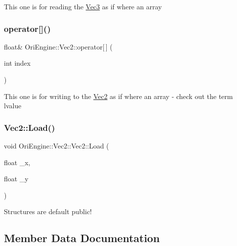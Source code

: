 This one is for reading the \hyperlink{struct_ori_engine_1_1_vec3}{Vec3} as if where an array \hypertarget{struct_ori_engine_1_1_vec2_a80dd5e430ccf80c1e7cac25da0262a8d}{}\label{struct_ori_engine_1_1_vec2_a80dd5e430ccf80c1e7cac25da0262a8d} 
\subsubsection{\texorpdfstring{operator[]()}{operator[]()}\hspace{0.1cm}{\footnotesize\ttfamily [2/2]}}
{\footnotesize\ttfamily float\& Ori\+Engine\+::\+Vec2\+::operator\mbox{[}$\,$\mbox{]} (\begin{DoxyParamCaption}\item[{int}]{index }\end{DoxyParamCaption})\hspace{0.3cm}{\ttfamily [inline]}}

This one is for writing to the \hyperlink{struct_ori_engine_1_1_vec2}{Vec2} as if where an array -\/ check out the term lvalue \hypertarget{struct_ori_engine_1_1_vec2_af08ea6c4eedd4b37fe25815f3555015e}{}\label{struct_ori_engine_1_1_vec2_af08ea6c4eedd4b37fe25815f3555015e} 
\subsubsection{\texorpdfstring{Vec2\+::\+Load()}{Vec2::Load()}}
{\footnotesize\ttfamily void Ori\+Engine\+::\+Vec2\+::\+Vec2\+::\+Load (\begin{DoxyParamCaption}\item[{float}]{\+\_\+x,  }\item[{float}]{\+\_\+y }\end{DoxyParamCaption})\hspace{0.3cm}{\ttfamily [inline]}}



Structures are default public! 



\subsection{Member Data Documentation}
\hypertarget{struct_ori_engine_1_1_vec2_a03d48413df5d90b9985f677b255e7135}{}\label{struct_ori_engine_1_1_vec2_a03d48413df5d90b9985f677b255e7135} 
